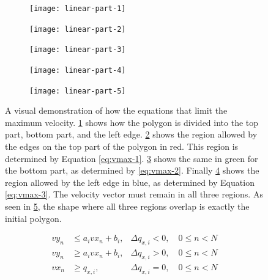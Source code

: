 \begin{figure}[!t]
    \centering
    
    \begin{subfigure}[t]{0.3\textwidth}
        \texttt{[image: linear-part-1]}
        \caption{}
        \label{fig:linear-part-1}
    \end{subfigure}
    \hfil
    \begin{subfigure}[t]{0.3\textwidth}
        \texttt{[image: linear-part-2]}
        \caption{}
        \label{fig:linear-part-2}
    \end{subfigure}
    \hfil    
    \begin{subfigure}[t]{0.3\textwidth}
        \texttt{[image: linear-part-3]}
        \caption{}
        \label{fig:linear-part-3}
    \end{subfigure}
    \hfil    
    \begin{subfigure}[t]{0.3\textwidth}
        \texttt{[image: linear-part-4]}
        \caption{}
        \label{fig:linear-part-4}
    \end{subfigure}
    \hfil    
    \begin{subfigure}[t]{0.3\textwidth}
        \texttt{[image: linear-part-5]}
        \caption{}
        \label{fig:linear-part-5}
    \end{subfigure}
    \caption[A visual demonstration of how the maximum velocity is constrained]{A visual demonstration of how the equations that limit the maximum velocity. \ref{fig:linear-part-1} shows how the polygon is divided into the top part, bottom part, and the left edge. \ref{fig:linear-part-2} shows the region allowed by the edges on the top part of the polygon in red. This region is determined by Equation \ref{eq:vmax-1}. \ref{fig:linear-part-3} shows the same in green for the bottom part, as determined by \ref{eq:vmax-2}. Finally  \ref{fig:linear-part-4} shows the region allowed by the left edge in blue, as determined by Equation \ref{eq:vmax-3}. The velocity vector must remain in all three regions. As seen in \ref{fig:linear-part-5}, the shape where all three regions overlap is exactly the initial polygon. }\label{fig:linear-demo}
\end{figure}

\begin{align}
vy_{n} &\leq a_i vx_{n} + b_i,  & \Delta q_{x,i} < 0, \quad 0 \leq n < N  \label{eq:vmax-1} \\
vy_{n} &\geq a_i vx_{n} + b_i,  & \Delta q_{x,i} > 0, \quad 0 \leq n < N \label{eq:vmax-2} \\
vx_{n} &\geq q_{x,i},  & \Delta q_{x,i} = 0, \quad 0 \leq n < N \label{eq:vmax-3}
\end{align}

